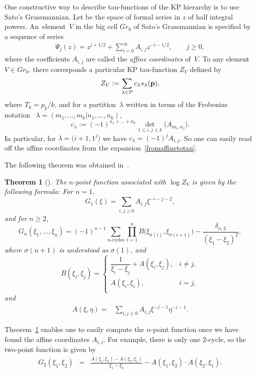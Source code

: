 \documentclass[11pt]{article}
\numberwithin{equation}{section}
\newcommand{\be}{\begin{equation}}
\newcommand{\beq}{\begin{equation}}
\newcommand{\ee}{\end{equation}}
\newcommand{\eeq}{\end{equation}}
\newcommand{\ben}{\begin{eqnarray*}}
\newcommand{\een}{\end{eqnarray*}}
\numberwithin{equation}{section}
\newtheorem{Theorem}{Theorem}[section]
\begin{document}
One constructive way to describe tau-functions of the KP hierarchy is
to use Sato's Grassmannian. Let
 be the space of formal series in $z$ of half integral powers.
An~element~$V$ in the big cell $Gr_0$ of Sato's Grassmannian is specified by a sequence of series
\begin{gather*} %
\Psi_j(z) = z^{j+1/2} + \sum_{i=0}^\infty A_{i,j} z^{-i-1/2}, \qquad j \geq 0,
\end{gather*}
where the coefficients $A_{i,j}$ are called the {\em affine coordinates} of~$V$. To any element~$V\in Gr_0$, there corresponds
a particular KP tau-function $Z_V$ defined by
\beq\label{fromaffinetotau}
Z_V:= \sum_{\lambda\in\mathcal{P}} c_\lambda s_\lambda({\bf p}),
\eeq
where $T_k=p_k/k$, and for a partition~$\lambda$ written in terms of the Frobenius notation~\cite[Section~I.1, p.~3]{Mac}
$\lambda=(m_1,\dots,m_k|n_1,\dots,n_k)$,
\[
c_\lambda := (-1)^{n_1+\dots+n_k} \det_{1\leq i,j\leq k} \bigl(A_{m_i, n_j}\bigr).
\]
In particular, for $\lambda=\bigl(i+1,1^j\bigr)$ we have $c_\lambda=(-1)^j A_{i,j}$.
So one can easily read off the affine coordinates from the expansion~\eqref{fromaffinetotau}.

The following theorem was obtained in~\cite{Zhou-Emergent}.

\begin{Theorem}[\cite{Zhou-Emergent}]\label{thm:n-point-KP}
The $n$-point function associated with $\log Z_V$ is given by the following formula:
For $n=1$,
\be \label{eqn:G-1}
G_1(\xi) = \sum_{i,j\geq 0} A_{i,j} \xi^{-i-j-2},
\ee
and for $n \ge2 $,
\be \label{eqn:G-n}
G_n(\xi_1, \ldots, \xi_n)
= (-1)^{n-1} \sum_{\text{$n$-cycles}}
\prod_{i=1}^n B\bigl(\xi_{\sigma(i)}, \xi_{\sigma(i+1)}\bigr)
- \frac{\delta_{n,2}}{(\xi_1-\xi_2)^2},
\ee
where $\sigma(n+1)$ is understood as $\sigma(1)$, and
\[
B(\xi_i, \xi_j) = \begin{cases}
\dfrac{1}{\xi_i-\xi_j} + A(\xi_i, \xi_j), & i \neq j, \\
A(\xi_i, \xi_i), & i =j, \\
\end{cases}
\]
and
\[
\begin{split}
A(\xi, \eta)
= & \sum_{i,j \geq 0} A_{i,j} \xi^{-j-1} \eta^{-i-1} .
\end{split}
\]
\end{Theorem}

Theorem~\ref{thm:n-point-KP} enables one to easily compute the $n$-point function once
we have found the affine coordinates $A_{i,j}$.
For example, there is only one $2$-cycle,
so the two-point function is given by
\ben
G_2(\xi_1, \xi_2)
& = & \frac{A(\xi_1, \xi_2) - A(\xi_2,\xi_1)}{\xi_1-\xi_2}
-A(\xi_1, \xi_2)\cdot A(\xi_2,\xi_1).
\een
\end{document}
